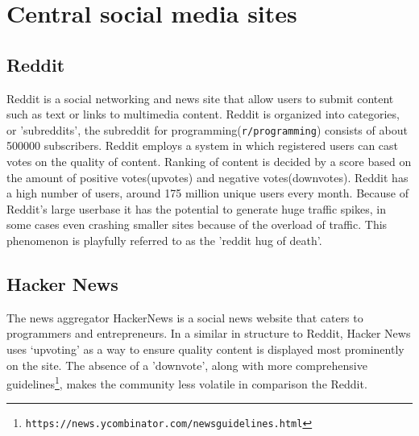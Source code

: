 \documentclass[a4paper,11pt]{article} %
\begin{document}
\section{Central social media sites}

\subsection{Reddit}

Reddit is a social networking and news site that allow users to submit content
such as text or links to multimedia content. Reddit is organized into categories, or 'subreddits', 
the subreddit for programming(\texttt{r/programming}) consists of about \num{500000}
subscribers.
Reddit employs a system in which registered users can cast votes on the
quality of content. Ranking of content is decided by a score based on the amount of positive
votes(upvotes) and negative votes(downvotes). Reddit has a high number of users, around 175 million
unique users every month. Because of Reddit's large userbase it has 
the potential to generate huge traffic spikes, in some cases even crashing
smaller sites because of the overload of traffic. This phenomenon is playfully referred to as 
the 'reddit hug of death’.


\subsection{Hacker News}
The news aggregator HackerNews is a social news website that caters to
programmers and entrepreneurs. In a similar in structure to Reddit, Hacker
News uses ‘upvoting’ as a way to ensure quality content is displayed most
prominently on the site. The absence of a 'downvote', along with more
comprehensive guidelines\footnote{\texttt{https://news.ycombinator.com/newsguidelines.html}},
makes the community less volatile in comparison the Reddit.
\end{document}
